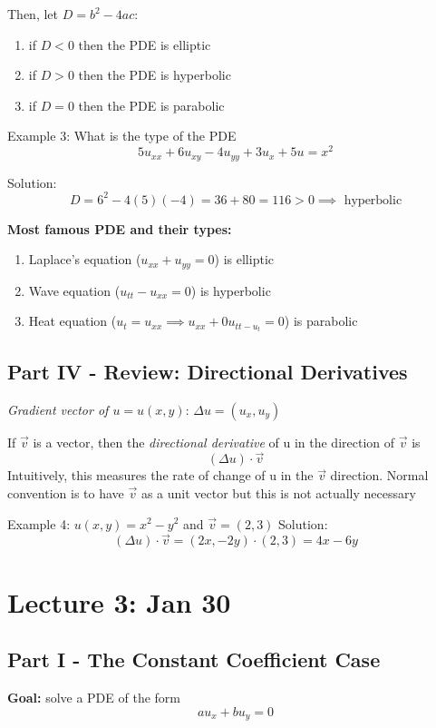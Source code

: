 \documentclass[12pt]{article}
\begin{document}
Then, let $D = b^2 - 4ac$:
\begin{enumerate}
    \item if $D < 0$ then the PDE is elliptic
    \item if $D > 0$ then the PDE is hyperbolic
    \item if $D = 0$ then the PDE is parabolic
\end{enumerate}

Example 3: What is the type of the PDE
\[5u_{xx} + 6u_{xy} - 4u_{yy} + 3u_x + 5u = x^2\]

Solution:
\[D = 6^2 - 4(5)(-4) = 36 + 80 = 116 > 0 \implies \boxed{\text{  hyperbolic}}\]

\textbf{Most famous PDE and their types:}
\begin{enumerate}
    \item Laplace's equation ($u_{xx} + u_{yy} = 0$) is elliptic
    \item Wave equation ($u_{tt} - u_{xx} = 0$) is hyperbolic
    \item Heat equation ($u_t = u_{xx} \implies u_{xx} + 0u_{tt - u_t} = 0$) is parabolic 
\end{enumerate}

\subsection*{Part IV - Review: Directional Derivatives}
\emph{Gradient vector of $u= u(x, y)$}: $\Delta u = (u_x, u_y)$

If $\vec{v}$ is a vector, then the \emph{directional derivative} of u in the direction of $\vec{v}$ is
\[(\Delta u)\cdot \vec{v}\]
Intuitively, this measures the rate of change of u in the $\vec{v}$ direction. Normal convention is to have $\vec{v}$ as a unit vector but this is not actually necessary

Example 4: $u(x, y) = x^2 - y^2$ and $\vec{v} = (2,3)$
Solution:
\[(\Delta u)\cdot \vec{v} = (2x, -2y) \cdot (2, 3) = \boxed{4x-6y}\]

\section{Lecture 3: Jan 30}
\subsection*{Part I - The Constant Coefficient Case}
\textbf{Goal:} solve a PDE of the form 
\[au_x + bu_y = 0\]
\end{document}
